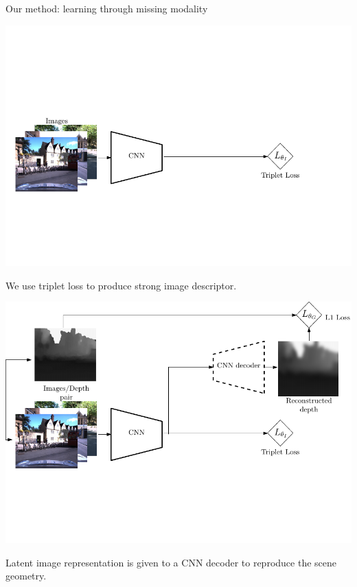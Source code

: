 \begin{frame}{Our method: learning through missing modality}	
	\only<1>
	{
	\begin{minipage}{0.6\linewidth}
		\centering
		\includegraphics[width=\linewidth]{vect/method/fig3/1}	
	\end{minipage}\hfill
	\begin{minipage}{0.3\linewidth}
		\raggedright
		We use triplet loss to produce strong image descriptor.
	\end{minipage}		
	}
	{
	\begin{minipage}{0.6\linewidth}
		\centering
		\includegraphics[width=\linewidth]{vect/method/fig3/2}	
	\end{minipage}\hfill
	\begin{minipage}{0.3\linewidth}
		\raggedright
		Latent image representation is given to a CNN decoder to reproduce the scene geometry.\\
		\vspace{0.5cm}
		

\end{minipage}}
\end{frame}
